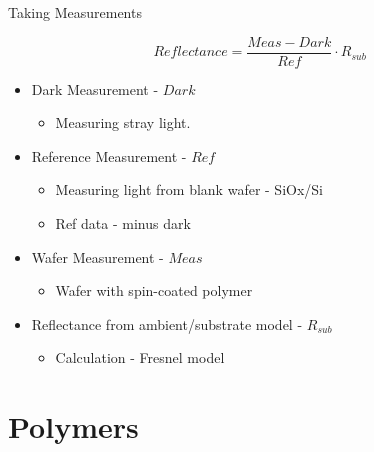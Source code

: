\documentclass[10pt]{beamer}
\begin{document}
\begin{frame}{Taking Measurements}

\begin{equation*}
Reflectance = \frac{Meas-Dark}{Ref}\cdot R_{sub}
\end{equation*}

\begin{itemize}
\item Dark Measurement - $Dark$\\
\begin{itemize}
\item Measuring stray light.
\end{itemize}
\item Reference Measurement - $Ref$\\
\begin{itemize}
\item Measuring light from blank wafer - SiOx/Si
\item Ref data - minus dark
\end{itemize}
\item Wafer Measurement - $Meas$\\
\begin{itemize}
\item Wafer with spin-coated polymer
\end{itemize}
\item Reflectance from ambient/substrate model - $R_{sub}$
\begin{itemize}
\item Calculation - Fresnel model
\end{itemize}
\end{itemize}

\end{frame}



	\section{Polymers}
	
\end{document}
